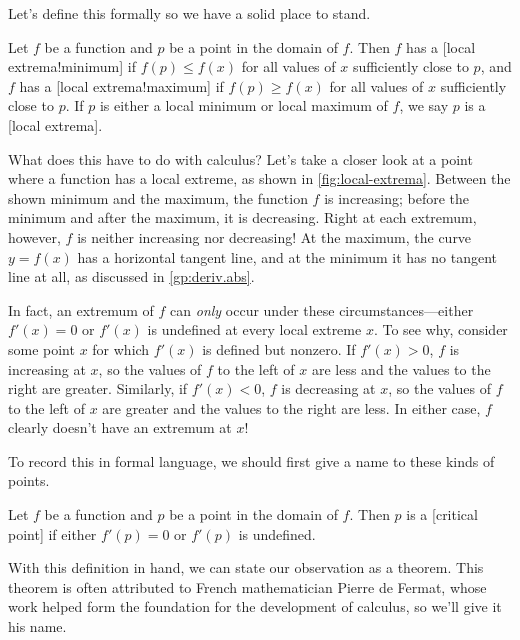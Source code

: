 \documentclass[../book/calcnotes.tex]{subfiles}
\begin{document}
Let's define this formally so we have a solid place to stand.

\begin{definition}
  \label{def:local-extrema}
  Let $f$ be a function and $p$ be a point in the domain of $f$.
  Then $f$ has a [local extrema!minimum] if $f(p) \leq f(x)$ for all values of $x$ sufficiently close to $p$, and $f$ has a [local extrema!maximum] if $f(p) \geq f(x)$ for all values of $x$ sufficiently close to $p$.
  If $p$ is either a local minimum or local maximum of $f$, we say $p$ is a [local extrema].
\end{definition}

What does this have to do with calculus?
Let's take a closer look at a point where a function has a local extreme, as shown in \cref{fig:local-extrema}.
Between the shown minimum and the maximum, the function $f$ is increasing; before the minimum and after the maximum, it is decreasing.
Right at each extremum, however, $f$ is neither increasing nor decreasing!
At the maximum, the curve $y = f(x)$ has a horizontal tangent line, and at the minimum it has no tangent line at all, as discussed in \cref{gp:deriv.abs}.

In fact, an extremum of $f$ can \emph{only} occur under these circumstances---either $f'(x) = 0$ or $f'(x)$ is undefined at every local extreme $x$.
To see why, consider some point $x$ for which $f'(x)$ is defined but nonzero.
If $f'(x) > 0$, $f$ is increasing at $x$, so the values of $f$ to the left of $x$ are less and the values to the right are greater.
Similarly, if $f'(x) < 0$, $f$ is decreasing at $x$, so the values of $f$ to the left of $x$ are greater and the values to the right are less.
In either case, $f$ clearly doesn't have an extremum at $x$!

To record this in formal language, we should first give a name to these kinds of points.

\begin{definition}
  \label{def:critical-points}
  Let $f$ be a function and $p$ be a point in the domain of $f$.
  Then $p$ is a [critical point] if either $f'(p) = 0$ or $f'(p)$ is undefined.
\end{definition}

With this definition in hand, we can state our observation as a theorem.
This theorem is often attributed to French mathematician Pierre de Fermat, whose work helped form the foundation for the development of calculus, so we'll give it his name.
\end{document}
